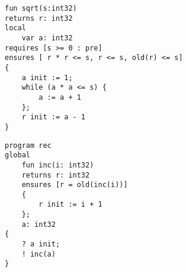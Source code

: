 \begin{lstlisting}[caption=Zugriff auf uninitialisierter Wert in preexecution State.]
fun sqrt(s:int32)
returns r: int32
local 
    var a: int32
requires [s >= 0 : pre]
ensures [ r * r <= s, r <= s, old(r) <= s]
{
    a init := 1;
    while (a * a <= s) {
        a := a + 1
    };      
    r init := a - 1
}
\end{lstlisting}

\begin{lstlisting}[caption=Rekursiver Aufruf in condition.]
program rec
global
    fun inc(i: int32)
    returns r: int32
    ensures [r = old(inc(i))]
    {
        r init := i + 1
    };
    a: int32
{
    ? a init;
    ! inc(a)    
}
\end{lstlisting}
